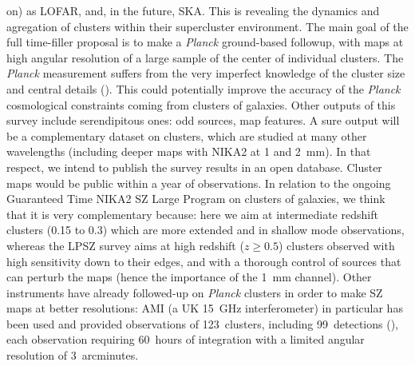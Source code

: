 \documentclass[10pt,a4paper,twoside,graphicx,color]{article}
\begin{document}
on) as LOFAR, and, in the future, SKA. This is revealing the dynamics
and agregation of clusters within their supercluster environment. The
main goal of the full time-filler proposal is to make a {\sl Planck}
ground-based followup, with maps at high angular resolution of a large
sample of the center of individual clusters. The {\sl Planck}
measurement suffers from the very imperfect knowledge of the cluster
size and central details (\cite{Planck2013PressProf}). This could
potentially improve the accuracy of the {\sl Planck} cosmological
constraints coming from clusters of galaxies.
Other outputs of this survey include serendipitous ones: odd sources,
map features. A sure output will be a complementary dataset on
clusters, which are studied at many other wavelengths (including
deeper maps with NIKA2 at 1 and 2~mm). In that respect, we intend to
publish the survey results in an open database. Cluster maps would be
public within a year of observations. In relation to the ongoing
Guaranteed Time NIKA2 SZ Large Program on clusters of galaxies, we
think that it is very complementary because: here we aim at
intermediate redshift clusters (0.15 to 0.3) which are more extended
and in shallow mode observations, whereas the LPSZ survey aims at high
redshift ($z\ge 0.5$) clusters observed with high sensitivity down to
their edges, and with a thorough control of sources that can perturb
the maps (hence the importance of the 1~mm channel). Other instruments
have already followed-up on {\sl Planck} clusters in order to make SZ
maps at better resolutions: AMI (a UK 15~GHz interferometer) in
particular has been used and provided observations of 123~clusters,
including 99~detections (\cite{Perrott2015}), each observation
requiring 60~hours of integration with a limited angular resolution of
3~arcminutes.\\
\end{document}
